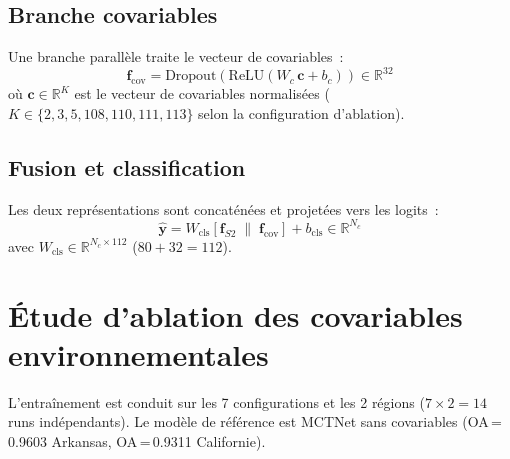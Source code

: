 \subsection{Branche covariables}

Une branche parallèle traite le vecteur de covariables~:
\[
    \mathbf{f}_{\text{cov}} =
    \text{Dropout}\!\left(\text{ReLU}\!\left(W_c\,\mathbf{c} + b_c\right)\right)
    \in \mathbb{R}^{32}
\]
où $\mathbf{c} \in \mathbb{R}^{K}$ est le vecteur de covariables normalisées
($K \in \{2, 3, 5, 108, 110, 111, 113\}$ selon la configuration d'ablation).

\subsection{Fusion et classification}

Les deux représentations sont concaténées et projetées vers les logits~:
\[
    \hat{\mathbf{y}} = W_{\text{cls}}\!\left[\mathbf{f}_{S2} \;\|\;
    \mathbf{f}_{\text{cov}}\right] + b_{\text{cls}} \in \mathbb{R}^{N_c}
\]
avec $W_{\text{cls}} \in \mathbb{R}^{N_c \times 112}$ ($80 + 32 = 112$).

\section{Étude d'ablation des covariables environnementales}

L'entraînement est conduit sur les 7 configurations et les 2 régions ($7 \times 2 = 14$
runs indépendants). Le modèle de référence est MCTNet sans covariables (OA\,=\,0.9603
Arkansas, OA\,=\,0.9311 Californie).

